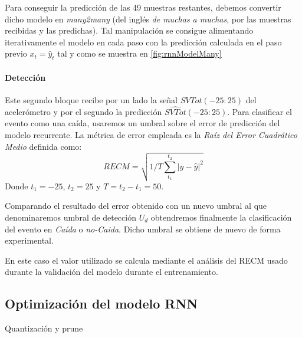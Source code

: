 \documentclass[../tfm.tex]{subfiles}
\begin{document}
Para conseguir la predicción de las 49 muestras restantes, debemos convertir dicho modelo en \textit{many2many} (del inglés \textit{de muchas a muchas}, por las muestras recibidas y las predichas). Tal manipulación se consigue alimentando iterativamente el modelo en cada paso con la predicción calculada en el paso previo $x_{t} = \hat{y}_t$ tal y como se muestra en \ref{fig:rnnModelMany}





\paragraph*{Detección}

Este segundo bloque recibe por un lado la señal $SVTot(-25:25)$ del acelerómetro y por el segundo la predicción $\hat{SVTot}(-25:25)$. Para clasificar el evento como una caída, usaremos un umbral sobre el error de predicción del modelo recurrente. La métrica de error empleada es la \textit{Raíz del Error Cuadrático Medio} definida como: \[
RECM=\sqrt{1/T\sum_{t_1}^{t_2}|y-\hat{y}|^2 }
\]Donde $t_1 = -25$, $t_2 = 25$ y $T=t_2-t_1=50$.

Comparando el resultado del error obtenido con un nuevo umbral al que denominaremos umbral de detección $U_{d}$ obtendremos finalmente la clasificación del evento en \textit{Caída} o \textit{no-Caida}. Dicho umbral se obtiene de nuevo de forma experimental.

En este caso el valor utilizado se calcula mediante el análisis del RECM usado durante la validación del modelo durante el entrenamiento.


\subsection{Optimización del modelo RNN}\label{desc_optim}

Quantización y prune
\end{document}

